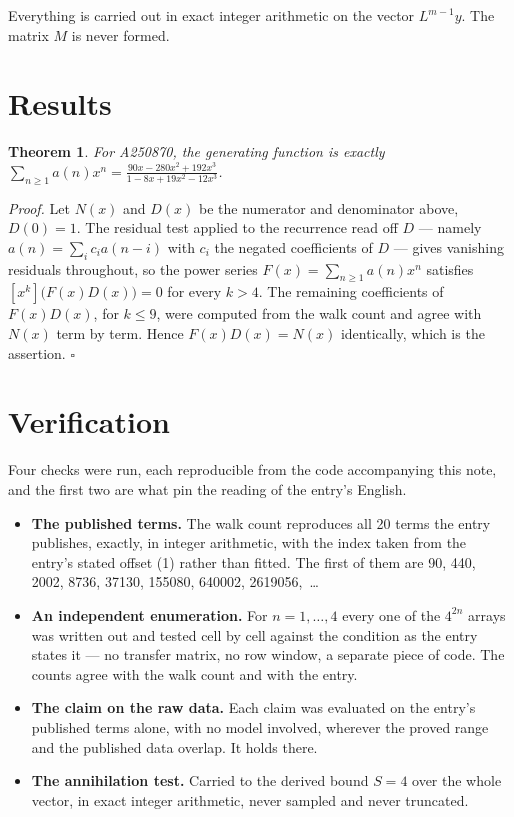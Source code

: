 \documentclass[11pt]{article}
\newtheorem{theorem}{Theorem}
\theoremstyle{definition}
\begin{document}
Everything is carried out in exact integer arithmetic on the vector $L^{m-1}y$. The matrix $M$ is never formed.

\section{Results}

\begin{theorem} For A250870, the generating function is exactly $\sum_{n\ge 1} a(n)x^n = \frac{90x - 280x^{2} + 192x^{3}}{1 - 8x + 19x^{2} - 12x^{3}}$.\end{theorem}

{\itshape Proof.} Let $N(x)$ and $D(x)$ be the numerator and denominator above, $D(0)=1$. The residual test applied to the recurrence read off $D$ --- namely $a(n) = \sum_i c_i a(n-i)$ with $c_i$ the negated coefficients of $D$ --- gives vanishing residuals throughout, so the power series $F(x)=\sum_{n\ge 1}a(n)x^n$ satisfies $[x^k]\bigl(F(x)D(x)\bigr) = 0$ for every $k > 4$. The remaining coefficients of $F(x)D(x)$, for $k \le 9$, were computed from the walk count and agree with $N(x)$ term by term. Hence $F(x)D(x) = N(x)$ identically, which is the assertion. $\square$

\section{Verification}

Four checks were run, each reproducible from the code accompanying this note, and the first two are what pin the reading of the entry's English.

\begin{itemize}

\item {\bfseries The published terms.} The walk count reproduces all 20 terms the entry publishes, exactly, in integer arithmetic, with the index taken from the entry's stated offset (1) rather than fitted. The first of them are 90, 440, 2002, 8736, 37130, 155080, 640002, 2619056,~\dots

\item {\bfseries An independent enumeration.} For $n = 1,\dots,4$ every one of the $4^{2n}$ arrays was written out and tested cell by cell against the condition as the entry states it --- no transfer matrix, no row window, a separate piece of code. The counts agree with the walk count and with the entry.

\item {\bfseries The claim on the raw data.} Each claim was evaluated on the entry's published terms alone, with no model involved, wherever the proved range and the published data overlap. It holds there.

\item {\bfseries The annihilation test.} Carried to the derived bound $S = 4$ over the whole vector, in exact integer arithmetic, never sampled and never truncated.

\end{itemize}
\end{document}
